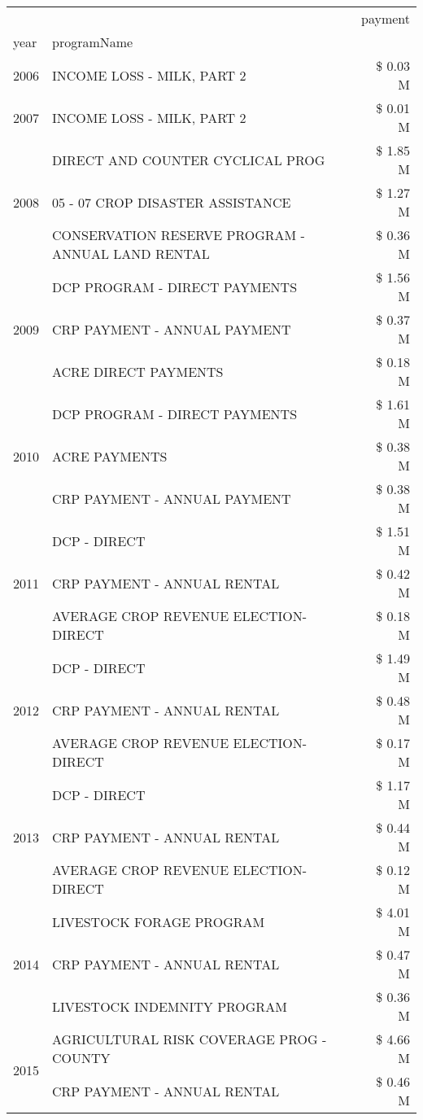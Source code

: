 \begin{tabular}{llr}
\toprule
 &  & payment \\
year & programName &  \\
\midrule
2006 & INCOME LOSS - MILK, PART 2 & \$ 0.03 M \\
\cline{1-3}
2007 & INCOME LOSS - MILK, PART 2 & \$ 0.01 M \\
\cline{1-3}
\multirow[t]{3}{*}{2008} & DIRECT AND COUNTER CYCLICAL PROG & \$ 1.85 M \\
 & 05 - 07 CROP DISASTER ASSISTANCE & \$ 1.27 M \\
 & CONSERVATION RESERVE PROGRAM - ANNUAL LAND RENTAL & \$ 0.36 M \\
\cline{1-3}
\multirow[t]{3}{*}{2009} & DCP PROGRAM - DIRECT PAYMENTS & \$ 1.56 M \\
 & CRP PAYMENT - ANNUAL PAYMENT & \$ 0.37 M \\
 & ACRE DIRECT PAYMENTS & \$ 0.18 M \\
\cline{1-3}
\multirow[t]{3}{*}{2010} & DCP PROGRAM - DIRECT PAYMENTS & \$ 1.61 M \\
 & ACRE PAYMENTS & \$ 0.38 M \\
 & CRP PAYMENT - ANNUAL PAYMENT & \$ 0.38 M \\
\cline{1-3}
\multirow[t]{3}{*}{2011} & DCP - DIRECT & \$ 1.51 M \\
 & CRP PAYMENT - ANNUAL RENTAL & \$ 0.42 M \\
 & AVERAGE CROP REVENUE ELECTION-DIRECT & \$ 0.18 M \\
\cline{1-3}
\multirow[t]{3}{*}{2012} & DCP - DIRECT & \$ 1.49 M \\
 & CRP PAYMENT - ANNUAL RENTAL & \$ 0.48 M \\
 & AVERAGE CROP REVENUE ELECTION-DIRECT & \$ 0.17 M \\
\cline{1-3}
\multirow[t]{3}{*}{2013} & DCP - DIRECT & \$ 1.17 M \\
 & CRP PAYMENT - ANNUAL RENTAL & \$ 0.44 M \\
 & AVERAGE CROP REVENUE ELECTION-DIRECT & \$ 0.12 M \\
\cline{1-3}
\multirow[t]{3}{*}{2014} & LIVESTOCK FORAGE PROGRAM & \$ 4.01 M \\
 & CRP PAYMENT - ANNUAL RENTAL & \$ 0.47 M \\
 & LIVESTOCK INDEMNITY PROGRAM & \$ 0.36 M \\
\cline{1-3}
\multirow[t]{3}{*}{2015} & AGRICULTURAL RISK COVERAGE PROG - COUNTY & \$ 4.66 M \\
 & CRP PAYMENT - ANNUAL RENTAL & \$ 0.46 M \\

\end{tabular}
